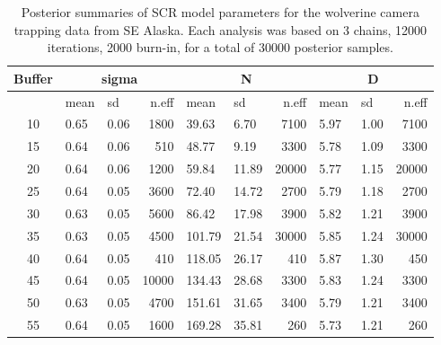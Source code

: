 {\begin{table}
{\small 
\centering
\caption{
Posterior summaries of SCR model parameters for the wolverine camera
trapping data from SE Alaska.
Each analysis was based on 3 chains, 12000 iterations, 2000 burn-in,
for a total of 30000 posterior samples. 
}
\begin{tabular}{cllrllrllr}
Buffer &\multicolumn{3}{c}{sigma} & \multicolumn{3}{c}{N} & \multicolumn{3}{c}{D} \\
\hline \hline 
   & mean &	sd	&n.eff&	mean &	sd   &n.eff&	mean&	sd&	n.eff \\ \hline
10&	0.65&	0.06&	1800&				39.63&	6.70& 7100&	5.97&	1.00&	7100 \\
15&	0.64&	0.06&	510&				48.77&	9.19&	3300&	5.78&	1.09&	3300\\
20&	0.64&	0.06&	1200&				59.84&	11.89&	20000&	5.77&	1.15&	20000\\
25&	0.64&	0.05&	3600&				72.40&	14.72&	2700&	5.79&	1.18&	2700\\
30&	0.63&	0.05&	5600&				86.42&	17.98&	3900&	5.82&	1.21&	3900\\
35&	0.63&	0.05&	4500&				101.79&	21.54&	30000&	5.85&	1.24&	30000\\
40&	0.64&	0.05&	410&				118.05&	26.17&	410&	5.87&	1.30&	450\\
45&	0.64&	0.05&	10000&				134.43&	28.68&	3300&	5.83&	1.24&	3300\\
50&	0.63&	0.05&	4700&				151.61&	31.65&	3400&	5.79&	1.21&	3400\\
55&	0.64&	0.05&	1600&				169.28&	35.81&	260&	5.73&	1.21&	260\\
\end{tabular}
}
\label{scr0.tab.wolverine-results}
\end{table}



}
